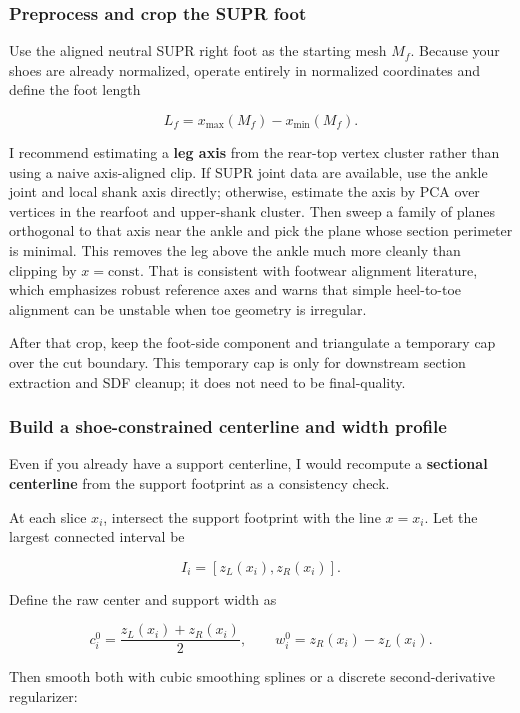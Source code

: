\documentclass[
  10.5pt,
]{article}
\begin{document}
\subsubsection{Preprocess and crop the SUPR
foot}\label{preprocess-and-crop-the-supr-foot}

Use the aligned neutral SUPR right foot as the starting mesh \(M_f\).
Because your shoes are already normalized, operate entirely in
normalized coordinates and define the foot length

\[
L_f = x_{\max}(M_f) - x_{\min}(M_f).
\]

I recommend estimating a \textbf{leg axis} from the rear-top vertex
cluster rather than using a naive axis-aligned clip. If SUPR joint data
are available, use the ankle joint and local shank axis directly;
otherwise, estimate the axis by PCA over vertices in the rearfoot and
upper-shank cluster. Then sweep a family of planes orthogonal to that
axis near the ankle and pick the plane whose section perimeter is
minimal. This removes the leg above the ankle much more cleanly than
clipping by \(x=\text{const}\). That is consistent with footwear
alignment literature, which emphasizes robust reference axes and warns
that simple heel-to-toe alignment can be unstable when toe geometry is
irregular.

After that crop, keep the foot-side component and triangulate a
temporary cap over the cut boundary. This temporary cap is only for
downstream section extraction and SDF cleanup; it does not need to be
final-quality.

\subsubsection{Build a shoe-constrained centerline and width
profile}\label{build-a-shoe-constrained-centerline-and-width-profile}

Even if you already have a support centerline, I would recompute a
\textbf{sectional centerline} from the support footprint as a
consistency check.

At each slice \(x_i\), intersect the support footprint with the line
\(x=x_i\). Let the largest connected interval be

\[
I_i = [z_L(x_i), z_R(x_i)].
\]

Define the raw center and support width as

\[
c_i^0 = \frac{z_L(x_i) + z_R(x_i)}{2}, \qquad
w_i^0 = z_R(x_i)-z_L(x_i).
\]

Then smooth both with cubic smoothing splines or a discrete
second-derivative regularizer:
\end{document}
